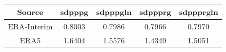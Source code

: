 
\begin{tabular}{ccccc}
\toprule
Source & sdpppg & sdpppgln & sdppprg & sdppprgln\\
\midrule
ERA-Interim & 0.8003 & 0.7986 & 0.7966 & 0.7970\\
ERA5 & 1.6404 & 1.5576 & 1.4349 & 1.5051\\
\bottomrule
\end{tabular}